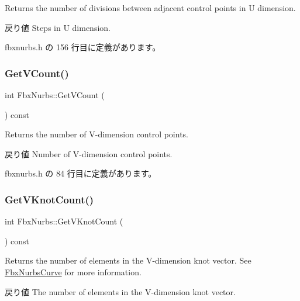 Returns the number of divisions between adjacent control points in U dimension. \begin{DoxyReturn}{戻り値}
Steps in U dimension. 
\end{DoxyReturn}


 fbxnurbs.\+h の 156 行目に定義があります。

\mbox{\label{class_fbx_nurbs_a0592be67af1b1e3f663964f932f12df4}} 
\subsubsection{\texorpdfstring{Get\+V\+Count()}{GetVCount()}}
{\footnotesize\ttfamily int Fbx\+Nurbs\+::\+Get\+V\+Count (\begin{DoxyParamCaption}{ }\end{DoxyParamCaption}) const\hspace{0.3cm}{\ttfamily [inline]}}

Returns the number of V-\/dimension control points. \begin{DoxyReturn}{戻り値}
Number of V-\/dimension control points. 
\end{DoxyReturn}


 fbxnurbs.\+h の 84 行目に定義があります。

\mbox{\label{class_fbx_nurbs_afd3187f4ef9e1e02b41f14bdb1a4bcbc}} 
\subsubsection{\texorpdfstring{Get\+V\+Knot\+Count()}{GetVKnotCount()}}
{\footnotesize\ttfamily int Fbx\+Nurbs\+::\+Get\+V\+Knot\+Count (\begin{DoxyParamCaption}{ }\end{DoxyParamCaption}) const}

Returns the number of elements in the V-\/dimension knot vector. See \hyperlink{class_fbx_nurbs_curve}{Fbx\+Nurbs\+Curve} for more information. \begin{DoxyReturn}{戻り値}
The number of elements in the V-\/dimension knot vector. 
\end{DoxyReturn}
\mbox{\label{class_fbx_nurbs_ab47ef5f3ec84fa392c38c1d0d3b2ca77}} 
